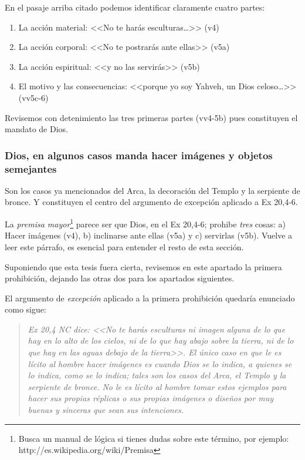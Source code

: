 \documentclass{article}
\begin{document}
\noindent
En el pasaje arriba citado podemos identificar claramente cuatro partes:

\begin{enumerate}
\item La acci\'on material: <<No te har\'as esculturas\ldots>> (v4)
\item La acci\'on corporal: <<No te postrar\'as ante ellas>> (v5a)
\item La acci\'on espiritual: <<y no las servir\'as>> (v5b)
\item El motivo y las consecuencias: <<porque yo soy Yahveh, un Dios celoso\ldots>> (vv5c-6)
\end{enumerate}

\noindent
Revisemos con detenimiento las tres primeras partes (vv4-5b) pues constituyen el mandato de Dios.

\subsubsection{Dios, en algunos casos manda hacer im\'agenes y objetos semejantes}

Son los casos ya mencionados del Arca, la decoraci\'on del Templo y la serpiente de bronce. Y constituyen el centro del argumento de excepci\'on aplicado a Ex 20,4-6.

La \emph{premisa mayor}\footnote{Busca un manual de l\'ogica si tienes dudas sobre este t\'ermino, por ejemplo: http://es.wikipedia.org/wiki/Premisa} parece ser que Dios, en el Ex 20,4-6; prohibe \emph{tres} cosas: a) Hacer im\'agenes (v4), b) inclinarse ante ellas (v5a) y c) servirlas (v5b). Vuelve a leer este p\'arrafo, es esencial para entender el resto de esta secci\'on.

Suponiendo que esta tesis fuera cierta, revisemos en este apartado la primera prohibici\'on, dejando las otras dos para los apartados siguientes.

El argumento de \emph{excepci\'on} aplicado a la primera prohibici\'on quedar\'{i}a enunciado como sigue:

\begin{quote}
\emph{Ex 20,4 NC dice: <<No te har\'as esculturas ni imagen alguna de lo que hay en lo alto de los cielos, ni de lo que hay abajo sobre la tierra, ni de lo que hay en las aguas debajo de la tierra>>. El \'unico caso en que le es l\'{i}cito al hombre hacer im\'agenes es cuando Dios se lo indica, a quienes se lo indica, como se lo indica; tales son los casos del Arca, el Templo y la serpiente de bronce. No le es l\'{i}cito al hombre tomar estos ejemplos para hacer sus propias r\'eplicas o sus propias im\'agenes o dise\~nos por muy buenas y sinceras que sean sus intenciones.}
\end{quote}
\end{document}
